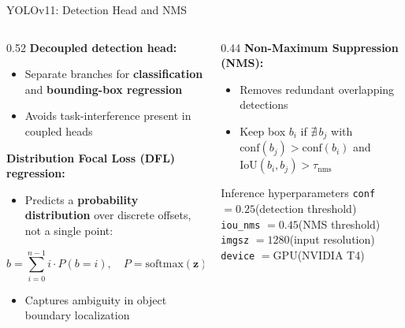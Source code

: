 \documentclass[aspectratio=169]{beamer}
\begin{document}
\begin{frame}{YOLOv11: Detection Head and NMS}
  \begin{columns}[T]
    \begin{column}{0.52\textwidth}
      \textbf{Decoupled detection head:}
      \begin{itemize}
        \item Separate branches for \textbf{classification} and
              \textbf{bounding-box regression}
        \item Avoids task-interference present in coupled heads
      \end{itemize}
      \vspace{0.3em}
      \textbf{Distribution Focal Loss (DFL) regression:}
      \begin{itemize}
        \item Predicts a \textbf{probability distribution} over
              discrete offsets, not a single point:
      \end{itemize}
      \[
        \hat{b} = \sum_{i=0}^{n-1} i \cdot P(b=i),
        \quad P = \mathrm{softmax}(\mathbf{z})
      \]
      \begin{itemize}
        \item Captures ambiguity in object boundary localization
      \end{itemize}
    \end{column}
    \begin{column}{0.44\textwidth}
      \textbf{Non-Maximum Suppression (NMS):}
      \begin{itemize}
        \item Removes redundant overlapping detections
        \item Keep box $b_i$ if $\nexists\, b_j$ with
              $\mathrm{conf}(b_j)>\mathrm{conf}(b_i)$ and
              $\mathrm{IoU}(b_i,b_j)>\tau_\mathrm{nms}$
      \end{itemize}
      \vspace{0.3em}
      \begin{block}{Inference hyperparameters}
        \small
        \texttt{conf} $= 0.25$\quad (detection threshold)\\
        \texttt{iou\_nms} $= 0.45$\quad (NMS threshold)\\
        \texttt{imgsz} $= 1280$\quad (input resolution)\\
        \texttt{device} $= \mathrm{GPU}$\quad (NVIDIA T4)
      \end{block}
    \end{column}
  \end{columns}
\end{frame}
\end{document}
